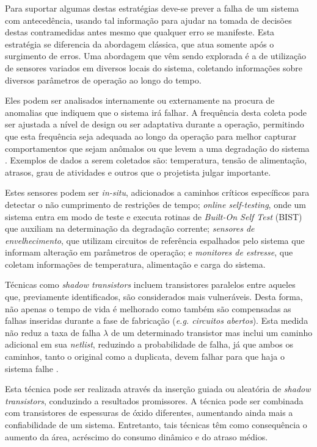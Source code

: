 Para suportar algumas destas estratégias deve-se prever a falha de um sistema com antecedência, usando tal informação para ajudar na tomada de decisões destas contramedidas antes mesmo que qualquer erro se manifeste. Esta estratégia se diferencia da abordagem clássica, que atua somente após o surgimento de erros. Uma abordagem que vêm sendo explorada é a de utilização de sensores variados em diversos locais do sistema, coletando informações sobre diversos parâmetros de operação ao longo do tempo. 

Eles podem ser analisados internamente ou externamente na procura de anomalias que indiquem que o sistema irá falhar. A frequência desta coleta pode ser ajustada a nível de design ou ser adaptativa durante a operação, permitindo que esta frequência seja adequada ao longo da operação para melhor capturar comportamentos que sejam anômalos ou que levem a uma degradação do sistema \cite{Agarwal2007}. Exemplos de dados a serem coletados são: temperatura, tensão de alimentação, atrasos, grau de atividades e outros que o projetista julgar importante.

Estes sensores podem ser \textit{in-situ}, adicionados a caminhos críticos específicos para detectar o não cumprimento de restrições de tempo; \textit{online self-testing}, onde um sistema entra em modo de teste e executa rotinas de \textit{Built-On Self Test} (BIST) que auxiliam na determinação da degradação corrente; \textit{sensores de envelhecimento}, que utilizam circuitos de referência espalhados pelo sistema que informam alteração em parâmetros de operação; e \textit{monitores de estresse}, que coletam informações de temperatura, alimentação e carga do sistema.

Técnicas como \textit{shadow transistors} incluem transistores paralelos entre aqueles que, previamente identificados, são considerados mais vulneráveis. Desta forma, não apenas o tempo de vida é melhorado como também são compensadas as falhas inseridas durante a fase de fabricação (\textit{e.g. circuitos abertos}). Esta medida não reduz a taxa de falha $\lambda$ de um determinado transistor mas inclui um caminho adicional em sua \textit{netlist}, reduzindo a probabilidade de falha, já que ambos os caminhos, tanto o original como a duplicata, devem falhar para que haja o sistema falhe \cite{Cornelius2008}.

Esta técnica pode ser realizada através da inserção guiada ou aleatória de \textit{shadow transistors}, conduzindo a resultados promissores. A técnica pode ser combinada com transistores de espessuras de óxido diferentes, aumentando ainda mais a confiabilidade de um sistema. Entretanto, tais técnicas têm como consequência o aumento da área, acréscimo do consumo dinâmico e do atraso médios.


